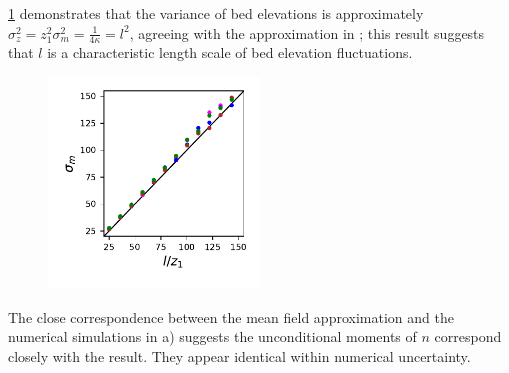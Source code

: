 \DIFaddend \ref{fig:var} demonstrates that the variance of bed elevations is approximately $\sigma_z^2 = z_1^2 \sigma_m^2 = \frac{1}{4\kappa}=l^2$, agreeing with the approximation in \DIFdelbegin {}\DIFdelend \DIFaddbegin {}\DIFaddend ; this result suggests that $l$ is a characteristic length scale of bed elevation fluctuations.
\DIFaddbegin \begin{figure}
	\centering
	\includegraphics[width=0.5\textwidth,keepaspectratio]{./figures/ch3/variance.pdf}
	\caption{}
	\label{fig:var}
\end{figure}
\indent \DIFaddend The close correspondence between the mean field approximation and the numerical simulations in \DIFdelbegin {}\DIFdelend \DIFaddbegin {}\DIFaddend a) suggests the unconditional moments of $n$ correspond closely with the \citet{Ancey2008} result. They appear \DIFdelbegin {}\DIFdelend identical within numerical uncertainty.

